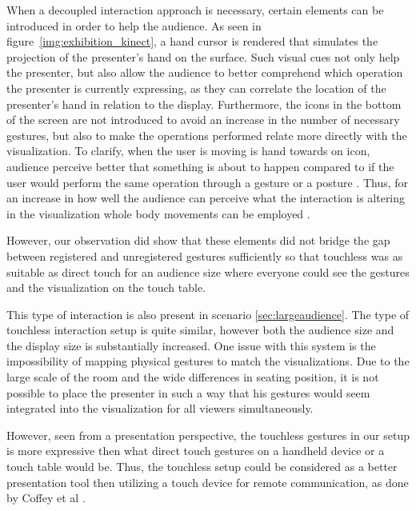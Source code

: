 \documentclass[review,journal]{vgtc}         %
\begin{document}
When a decoupled interaction approach is necessary, certain elements can be introduced in order to help the audience.
As seen in figure~\ref{img:exhibition_kinect}, a hand cursor is rendered that simulates the projection of the presenter's hand on the surface.
Such visual cues not only help the presenter, but also allow the audience to better  comprehend which operation the presenter is currently expressing, as they can correlate the location of the presenter's hand in relation to the display.
Furthermore, the icons in the bottom of the screen are not introduced to avoid an increase in the number of necessary gestures, but also to make the operations performed relate more directly with the visualization. 
To clarify, when the user is moving is hand towards on icon, audience perceive better that something is about to happen compared to if the user would perform the same operation through a gesture or a posture \cite{isenberg:hal-00781237}. 
Thus, for an increase in how well the audience can perceive what the interaction is altering in the visualization whole body movements can be employed \cite{978-0-85729-432-6, Shoemaker:2010:BIT:1868914.1868967}. 

However, our observation did show that these elements did not bridge the gap between registered and unregistered gestures sufficiently so that touchless was as suitable as direct touch for an audience size where everyone could see the gestures and the visualization on the touch table.

This type of interaction is also present in scenario \ref{sec:largeaudience}. The type of touchless interaction setup is quite similar, however both the audience size and the display size is substantially increased.
One issue with this system is the impossibility of mapping physical gestures to match the visualizations.
Due to the large scale of the room and the wide differences in seating position, it is not possible to place the presenter in such a way that his gestures would seem integrated into the visualization for all viewers simultaneously.

However, seen from a presentation perspective, the touchless gestures in our setup is more expressive then what direct touch gestures on a handheld device or a touch table would be.
Thus, the touchless setup could be considered as a better presentation tool then utilizing a touch device for remote communication, as done by Coffey et al \cite{Coffey:2012:ISW:2360744.2360843}.

\end{document}
